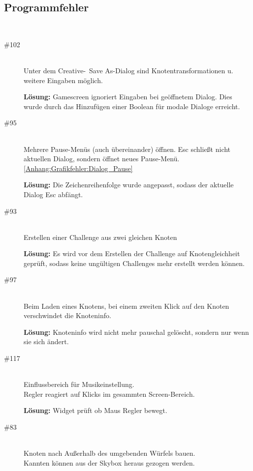 %



\subsection*{Programmfehler}


~\\
\begin{description}

\item[\#102] \hfill \\
Unter dem Creative-\glqq~Save As\grqq-Dialog sind Knotentransformationen u. weitere Eingaben möglich.

{\bfseries Lösung:} Gamescreen ignoriert Eingaben bei geöffnetem Dialog. Dies wurde durch das Hinzufügen einer Boolean für modale Dialoge erreicht. 


\item[\#95] \hfill \\
Mehrere Pause-Menüs (auch übereinander) öffnen.
Esc schließt nicht aktuellen Dialog, sondern öffnet neues Pause-Menü. \ref{Anhang:Grafikfehler:Dialog_Pause}

{\bfseries Lösung:} Die Zeichenreihenfolge wurde angepasst, sodass der aktuelle Dialog Esc abfängt.


\item[\#93] \hfill \\
Erstellen einer Challenge aus zwei gleichen Knoten

{\bfseries Lösung:}  Es wird vor dem Erstellen der Challenge auf Knotengleichheit geprüft, sodass keine ungültigen Challenges mehr erstellt werden können.


\item[\#97] \hfill \\
Beim Laden eines Knotens, bei einem zweiten Klick auf den Knoten verschwindet die Knoteninfo.

{\bfseries Lösung:} Knoteninfo wird nicht mehr pauschal gelöscht, sondern nur wenn sie sich ändert. 


\item[\#117] \hfill \\
Einflussbereich für Musikeinstellung. \\
Regler reagiert auf Klicks im gesammten Screen-Bereich.

{\bfseries Lösung:} Widget prüft ob Maus Regler bewegt.


\item[\#83] \hfill \\
Knoten nach Außerhalb des umgebenden Würfels bauen. \\
Kannten können aus der Skybox heraus gezogen werden.


\end{description}
